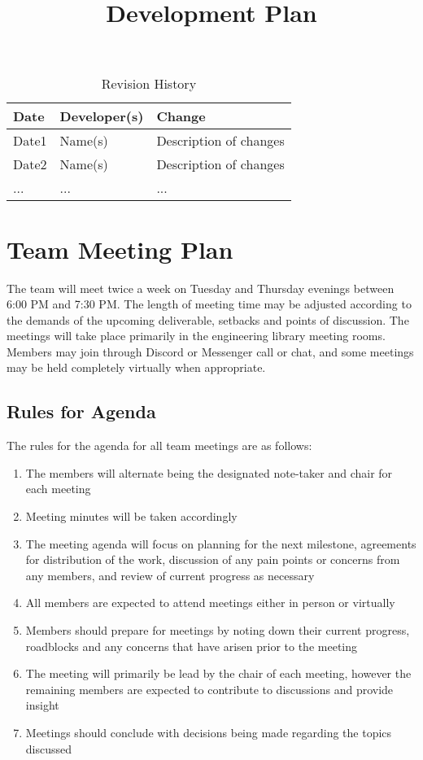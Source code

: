 \documentclass{article}
\title{Development Plan\\\progname}
\author{\authname}
\date{}
\begin{document}
\begin{table}[hp]
\caption{Revision History} \label{TblRevisionHistory}
\begin{tabularx}{\textwidth}{llX}
\toprule
\textbf{Date} & \textbf{Developer(s)} & \textbf{Change}\\
\midrule
Date1 & Name(s) & Description of changes\\
Date2 & Name(s) & Description of changes\\
... & ... & ...\\
\bottomrule
\end{tabularx}
\end{table}

\newpage

\maketitle


\section{Team Meeting Plan}

	The team will meet twice a week on Tuesday and Thursday evenings between 6:00 PM and 7:30 PM. The length of meeting time may be adjusted according to the demands of the upcoming deliverable, setbacks and points of discussion. The meetings will take place primarily in the engineering library meeting rooms. Members may join through Discord or Messenger call or chat, and some meetings may be held completely virtually when appropriate.

\subsection{Rules for Agenda}
The rules for the agenda for all team meetings are as follows:
\begin{enumerate}
    \item  The members will alternate being the designated note-taker and chair for each meeting
    \item Meeting minutes will be taken accordingly 
    \item The meeting agenda will focus on planning for the next milestone, agreements for distribution of the work, discussion of any pain points or concerns from any members, and review of current progress as necessary
    \item All members are expected to attend meetings either in person or virtually
    \item Members should prepare for meetings by noting down their current progress, roadblocks and any concerns that have arisen prior to the meeting
    \item The meeting will primarily be lead by the chair of each meeting, however the remaining members are expected to contribute to discussions and provide insight
    \item Meetings should conclude with decisions being made regarding the topics discussed
\end{enumerate}
\end{document}
